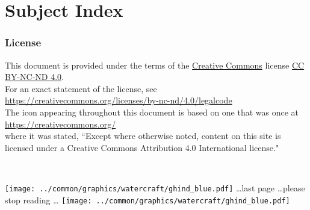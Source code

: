 \chapter*{Subject Index}
%
\begin{multicols}{3}
  
\end{multicols}

\subsection*{License}
This document is provided under the terms of 
the \href{https://creativecommons.org/}{Creative Commons} license \href{https://creativecommons.org/licenses/}{CC BY-NC-ND 4.0}.
\\For an exact statement of the license, see 
\\\indentx\url{https://creativecommons.org/licenses/by-nc-nd/4.0/legalcode}
\\
The icon 
appearing throughout this document is based on one that was once at 
\\\indentx\url{https://creativecommons.org/}\\
where it was stated, 
``Except where otherwise noted, content on this site is licensed under a Creative Commons Attribution 4.0 International license."

\cleartooddpage
\mbox{}\\\vfill
%
\begin{center}
\texttt{[image: ../common/graphics/watercraft/ghind\_blue.pdf]}%
{\sffamily\ldots last page \ldots please stop reading \ldots} 
\texttt{[image: ../common/graphics/watercraft/ghind\_blue.pdf]}%
\label{doc:end}
\end{center}
